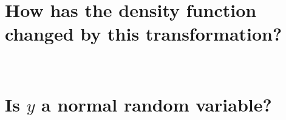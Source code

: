 \documentclass[12pt,letterpaper, onecolumn]{exam}
\begin{document}
\begin{questions}
\begin{parts}
		\part{How has the density function changed by this transformation?}\\
		\solution
		\part{Is $y$ a normal random variable?}\\
		\solution
	\end{parts}
\end{questions}
\end{document}
